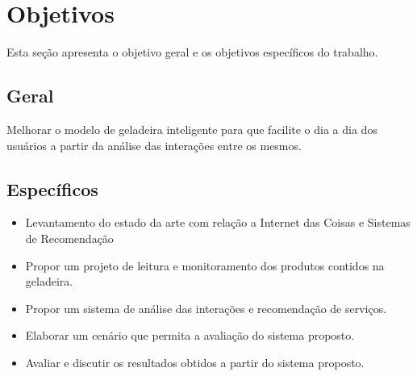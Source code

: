 \section{Objetivos}
Esta seção apresenta o objetivo geral e os objetivos específicos do trabalho.

\subsection{Geral}


    
Melhorar o modelo de geladeira inteligente para que facilite o dia a dia dos usuários a partir da análise das interações entre os mesmos.

\subsection{Específicos}


\begin{itemize} %
	\item Levantamento do estado da arte com relação a Internet das Coisas e Sistemas de Recomendação
	\item Propor um projeto de leitura e monitoramento dos produtos contidos na geladeira.
	\item Propor um sistema de análise das interações e recomendação de serviços.
	\item Elaborar um cenário que permita a avaliação do sistema proposto.
	\item Avaliar e discutir os resultados obtidos a partir do sistema proposto.


\end{itemize}

